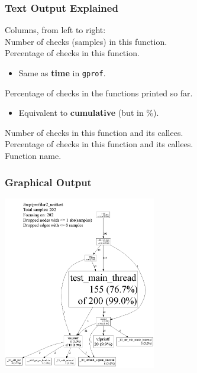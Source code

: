 \begin{frame}
  \frametitle{Text Output Explained}

  
    Columns, from left to right:\\[1em]

    Number of checks (samples) in this function.\\
    Percentage of checks in this function.
      \begin{itemize}
        \item Same as {\bf time} in {\tt gprof}.\\[1em]
      \end{itemize}
    Percentage of checks in the functions printed so far.
      \begin{itemize}
        \item Equivalent to {\bf cumulative} (but in \%).\\[1em]
      \end{itemize}
    Number of checks in this function and its callees.\\
    Percentage of checks in this function and its callees.\\
    Function name.
  
\end{frame}

\begin{frame}
  \frametitle{Graphical Output}

  \begin{center}
    \includegraphics[width=0.5\textwidth]{images/pprof-test-big.png}
  \end{center}
\end{frame}

